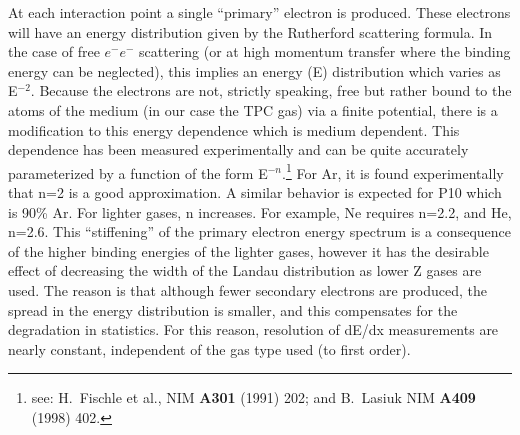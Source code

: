 \documentclass[twoside]{article}
\begin{document}
At each interaction point a single ``primary'' electron is produced.  
These electrons will have an energy distribution given by 
the Rutherford scattering formula.  In the case of free $e^{-}e^{-}$ 
scattering (or at high momentum transfer where the binding energy
can be neglected), this implies an energy (E) distribution which
varies as E$^{-2}$.  Because the electrons are not, strictly speaking,
free  but rather bound to the atoms of the medium (in our case the TPC gas)
via a finite potential, there is a modification to this energy dependence
which is medium dependent.  This dependence has been measured experimentally
and can be quite accurately parameterized by a function of the
form E$^{-n}$.\footnote{see: H.~Fischle et al., NIM {\bf A301} (1991) 202;
  and B.~Lasiuk NIM {\bf A409} (1998) 402.}
For Ar, it is found experimentally that  
n=2 is a good approximation.  A similar behavior is expected for P10
which is 90\% Ar.  For lighter gases, n increases.  For
example, Ne requires n=2.2, and He, n=2.6.  This ``stiffening'' of the
primary electron energy spectrum is a consequence of the higher
binding energies of the lighter gases, however it has the desirable
effect of decreasing the width of the Landau distribution as
lower Z gases are used.  The reason is that although fewer secondary
electrons are produced, the spread in the energy distribution is smaller,
and this compensates for the degradation in statistics.
For this reason, resolution of dE/dx
measurements are nearly constant, independent of the gas
type used (to first order).
    
\end{document}
